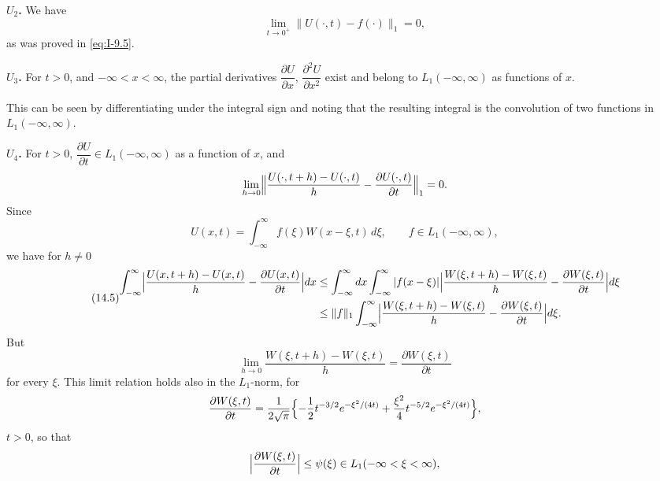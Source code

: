 \noindent\textbf{$U_2$.} We have
\begin{equation*}
\lim_{t\to 0^+}\|U(\cdot,t)-f(\cdot)\|_1=0,
\end{equation*}
as was proved in \eqref{eq:I-9.5}.

\noindent\textbf{$U_3$.} For $t>0$, and $-\infty<x<\infty$, the partial derivatives $\dfrac{\partial U}{\partial x}$, $\dfrac{\partial^{2}U}{\partial x^{2}}$ exist and belong to $L_1(-\infty,\infty)$ as functions of $x$.

This can be seen by differentiating under the integral sign and noting that the resulting integral is the convolution of two functions in $L_1(-\infty,\infty)$.

\noindent\textbf{$U_4$.} For $t>0$, $\dfrac{\partial U}{\partial t}\in L_1(-\infty,\infty)$ as a function of $x$, and
\begin{equation*}
\lim_{h\to 0}\Bigl\|\frac{U(\cdot,t+h)-U(\cdot,t)}{h}-\frac{\partial U(\cdot,t)}{\partial t}\Bigr\|_1=0.
\end{equation*}
Since
\begin{equation*}
U(x,t)=\int_{-\infty}^{\infty}f(\xi)W(x-\xi,t)\,d\xi,\qquad f\in L_1(-\infty,\infty),
\end{equation*}
we have for $h\neq 0$
\begin{equation}\label{eq:I-14.5}\tag{14.5}
\begin{aligned}
\int_{-\infty}^{\infty}\Bigl|\frac{U(x,t+h)-U(x,t)}{h}-\frac{\partial U(x,t)}{\partial t}\Bigr|dx
&\le\int_{-\infty}^{\infty}dx\int_{-\infty}^{\infty}|f(x-\xi)|\Bigl|\frac{W(\xi,t+h)-W(\xi,t)}{h}-\frac{\partial W(\xi,t)}{\partial t}\Bigr|d\xi\\
&\le\|f\|_1\int_{-\infty}^{\infty}\Bigl|\frac{W(\xi,t+h)-W(\xi,t)}{h}-\frac{\partial W(\xi,t)}{\partial t}\Bigr|d\xi.
\end{aligned}
\end{equation}
But
\begin{equation*}
\lim_{h\to 0}\frac{W(\xi,t+h)-W(\xi,t)}{h}=\frac{\partial W(\xi,t)}{\partial t}
\end{equation*}
for every $\xi$. This limit relation holds also in the $L_1$-norm, for
\begin{equation*}
\frac{\partial W(\xi,t)}{\partial t}
=\frac{1}{2\sqrt{\pi}}\Bigl\{-\frac12t^{-3/2}e^{-\xi^{2}/(4t)}+\frac{\xi^{2}}{4}t^{-5/2}e^{-\xi^{2}/(4t)}\Bigr\},
\end{equation*}
$t>0$, so that
\begin{equation*}
\Bigl|\frac{\partial W(\xi,t)}{\partial t}\Bigr|\le\psi(\xi)\in L_1(-\infty<\xi<\infty),
\end{equation*}
